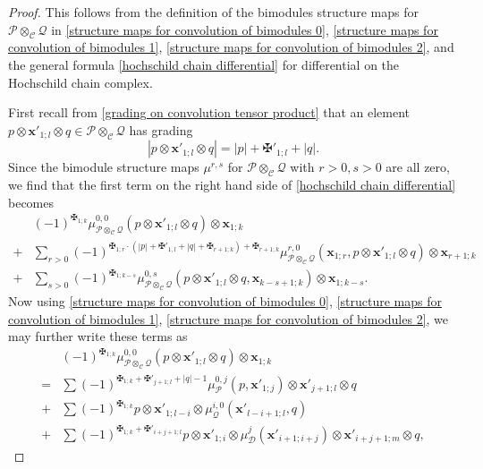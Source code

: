 \documentclass[11pt]{amsproc}
\def\cP{\mathcal{P}}
\def\cQ{\mathcal{Q}}
\def\cc{\mathcal{C}}
\def\dd{\mathcal{D}}
\theoremstyle{remark}
\numberwithin{equation}{section}
\begin{document}
\begin{proof}
This follows from the definition of the bimodules structure maps for $\cP \otimes_{\cc} \cQ$ in \eqref{structure maps for convolution of bimodules 0}, \eqref{structure maps for convolution of bimodules 1}, \eqref{structure maps for convolution of bimodules 2},
and the general formula \eqref{hochschild chain differential} for differential on the Hochschild chain complex.

First recall from \eqref{grading on convolution tensor product} that an element $p \otimes \mathbf{x}'_{1;l} \otimes q \in \cP \otimes_{\cc} \cQ$ has grading
\[
|p \otimes \mathbf{x}'_{1;l} \otimes q| = |p| + \maltese'_{1;l} + |q|.
\]
Since the bimodule structure maps $\mu^{r, s}$ for $\cP \otimes_{\cc} \cQ$ with $r>0, s>0$ are all zero, 
we find that the first term on the right hand side of \eqref{hochschild chain differential} becomes
\begin{equation}
\begin{split}
& (-1)^{\maltese_{1;k}} \mu_{\cP \otimes_{\cc} \cQ}^{0, 0}(p \otimes \mathbf{x}'_{1;l} \otimes q) \otimes \mathbf{x}_{1;k} \\
+ & \sum_{r>0} (-1)^{\maltese_{1;r} \cdot (|p| + \maltese'_{1, l} + |q| + \maltese_{r+1;k}) + \maltese_{r+1;k}} \mu_{\cP \otimes_{\cc} \cQ}^{r, 0}(\mathbf{x}_{1;r}, p \otimes \mathbf{x}'_{1;l} \otimes q) \otimes \mathbf{x}_{r+1;k} \\
+ & \sum_{s>0} (-1)^{\maltese_{1; k-s}} \mu_{\cP \otimes_{\cc} \cQ}^{0, s}(p \otimes \mathbf{x}'_{1;l} \otimes q, \mathbf{x}_{k-s+1;k}) \otimes \mathbf{x}_{1; k-s}.
\end{split}
\end{equation}
Now using \eqref{structure maps for convolution of bimodules 0}, \eqref{structure maps for convolution of bimodules 1}, \eqref{structure maps for convolution of bimodules 2}, 
we may further write these terms as
\begin{equation}\label{mu 00 on convolution}
\begin{split}
& (-1)^{\maltese_{1;k}} \mu_{\cP \otimes_{\cc} \cQ}^{0, 0}(p \otimes \mathbf{x}'_{1;l} \otimes q) \otimes \mathbf{x}_{1;k} \\
= & \sum (-1)^{\maltese_{1;k} + \maltese'_{j+1;l} + |q| - 1} \mu_{\cP}^{0, j}(p, \mathbf{x}'_{1;j}) \otimes \mathbf{x}'_{j+1; l} \otimes q \\
+ & \sum (-1)^{\maltese_{1;k}}  p \otimes \mathbf{x}'_{1; l-i} \otimes \mu_{\cQ}^{i, 0}(\mathbf{x}'_{l-i+1;l}, q) \\
+ & \sum (-1)^{\maltese_{1;k} + \maltese'_{i+j+1;l}} p \otimes \mathbf{x}'_{1;i} \otimes \mu_{\dd}^{j}(\mathbf{x}'_{i+1;i+j}) \otimes \mathbf{x}'_{i+j+1;m} \otimes q,

\end{split}
\end{equation}
\end{proof}
\end{document}
